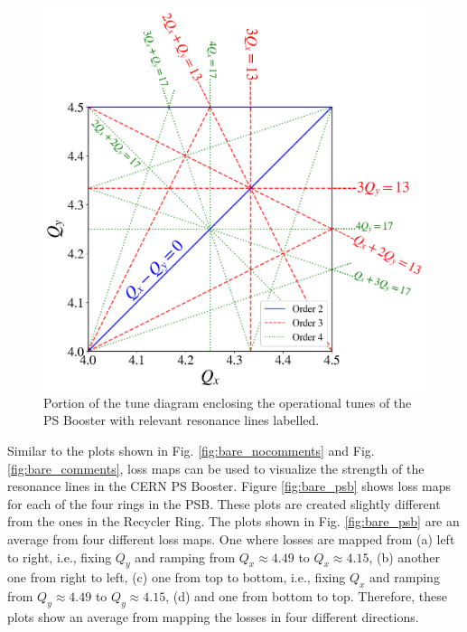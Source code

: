 \begin{figure}[H]
    \centering
    \includegraphics[width=\linewidth]{chapter5/psb_td.png}
    \caption{Portion of the tune diagram enclosing the operational tunes of the PS Booster with relevant resonance lines labelled.}
    \label{fig:psbtd}
\end{figure}

Similar to the plots shown in Fig. \ref{fig:bare_nocomments} and Fig. \ref{fig:bare_comments}, loss maps can be used to visualize the strength of the resonance lines in the CERN PS Booster. Figure \ref{fig:bare_psb} shows loss maps for each of the four rings in the PSB. These plots are created slightly different from the ones in the Recycler Ring. The plots shown in Fig. \ref{fig:bare_psb} are an average from four different loss maps. One where losses are mapped from (a) left to right, i.e., fixing $Q_y$ and ramping from $Q_x \approx 4.49$ to $Q_x \approx 4.15$, (b) another one from right to left, (c) one from top to bottom, i.e., fixing $Q_x$ and ramping from $Q_y \approx 4.49$ to $Q_y \approx 4.15$, (d) and one from bottom to top. Therefore, these plots show an average from mapping the losses in four different directions.    

